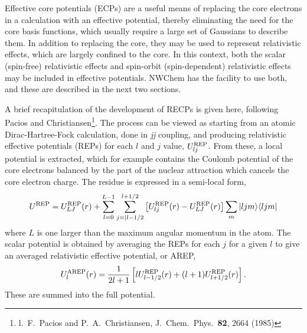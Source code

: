 %
%
\label{sec:ecp}
\def\ell{l}
Effective core potentials (ECPs) are a useful means of replacing the core
electrons in a calculation with an effective potential, thereby eliminating
the need for the core basis functions, which usually require a large set of
Gaussians to describe them. In addition to replacing the core, they may be
used to represent relativistic effects, which are largely confined to the
core. In this context, both the scalar (spin-free) relativistic effects and
spin-orbit (spin-dependent) relativistic effects may be included in
effective potentials. NWChem has the facility to use both, and these are
described in the next two sections.

A brief recapitulation of the development of RECPs is given here, following
Pacios and Christiansen\footnote{l.~F.~Pacios and P.~A.~Christiansen,
J.~Chem.~Phys.~{\bf 82}, 2664 (1985)}. The process can be viewed as starting
from an atomic Dirac-Hartree-Fock calculation, done in {\it jj} coupling,
and producing relativistic effective potentials (REPs) for each $\ell$ and
$j$ value, $U^{\rm REP}_{\ell j}$.  From these, a local potential is
extracted, which for example contains the Coulomb potential of the core
electrons balanced by the part of the nuclear attraction which cancels the
core electron charge. The residue is expressed in a semi-local form,
\begin{equation}
U^{\rm REP} = U^{\rm REP}_{LJ}(r) + \sum_{\ell=0}^{L-1}
\sum_{j=|\ell-1/2}^{\ell+1/2} \left[ U^{\rm REP}_{\ell j}(r) -  
U^{\rm REP}_{LJ}(r) \right] \sum_m | \ell j m \rangle \langle \ell j m |
\end{equation}
where $L$ is one larger than the maximum angular momentum in the atom.
The scalar potential is obtained by averaging the REPs for each $j$ for a
given $\ell$ to give an averaged relativistic effective potential, or AREP,
\begin{equation}
U^{\rm AREP}_\ell(r) = \frac{1}{2\ell+1} \left[ \ell U^{\rm REP}_{\ell-1/2}(r)
+ (\ell+1) U^{\rm REP}_{\ell+1/2}(r) \right].
\end{equation}
These are summed into the full potential.

